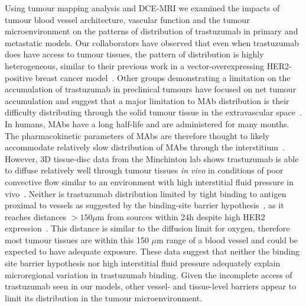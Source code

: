 Using tumour mapping analysis and \acs{DCE-MRI} we examined the impacts of tumour blood vessel architecture, vascular function and the tumour microenvironment on the patterns of distribution of trastuzumab in primary and metastatic models.
Our collaborators have observed that even when trastuzumab does have access to tumour tissues, the pattern of distribution is highly heterogeneous, similar to their previous work in a vector-overexpressing \acs{HER2}-positive breast cancer model~\cite{Baker:2008ci}.
Other groups demonstrating a limitation on the accumulation of trastuzumab in preclinical tumours have focused on net tumour accumulation and suggest that a major limitation to \acs{MAb} distribution is their difficulty distributing through the solid tumour tissue in the extravascular space~\cite{Jain:2010ie,Chauhan:2011fi,Lee:2010gb}.
In humans, \acs{MAb}s have a long half-life and are administered for many months.
The pharmacokinetic parameters of \acs{MAb}s are therefore thought to likely accommodate relatively slow distribution of \acs{MAb}s through the interstitium~\cite{Chauhan:2011fi,Thurber:2012dd}.
However, 3D tissue-disc data from the Minchinton lab shows trastuzumab is able to diffuse relatively well through tumour tissues \emph{in vivo} in conditions of poor convective flow similar to an environment with high interstitial fluid pressure in vivo~\cite{Baker:2018ex}.
Neither is trastuzumab distribution limited by tight binding to antigen proximal to vessels as suggested by the binding-site barrier hypothesis~\cite{Juweid:1992ty}, as it reaches distances $>150 \mu$m from sources within 24h despite high \acs{HER2} expression~\cite{Baker:2018ex}.
This distance is similar to the diffusion limit for oxygen, therefore most tumour tissues are within this 150 $\mu$m range of a blood vessel and could be expected to have adequate exposure.
These data suggest that neither the binding site barrier hypothesis nor high interstitial fluid pressure adequately explain microregional variation in trastuzumab binding.
Given the incomplete access of trastuzumab seen in our models, other vessel- and tissue-level barriers appear to limit its distribution in the tumour microenvironment.

